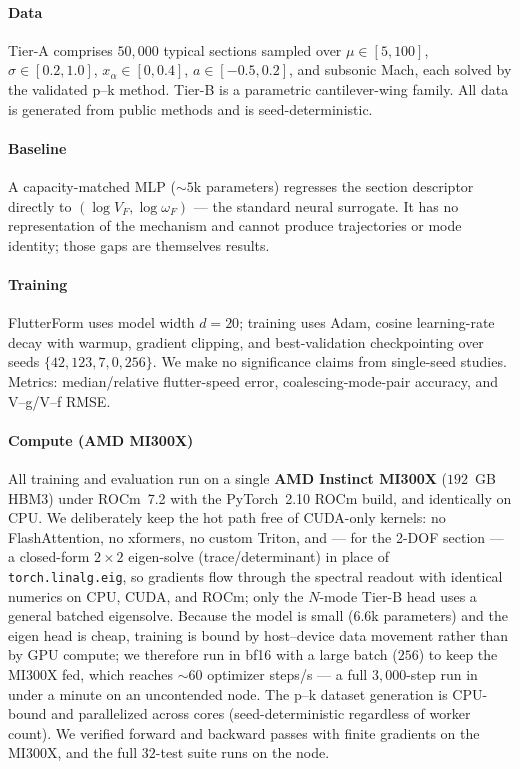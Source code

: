 \documentclass{article}
\begin{document}
\paragraph{Data} Tier-A comprises $50{,}000$ typical sections sampled over
$\mu\!\in\![5,100]$, $\sigma\!\in\![0.2,1.0]$, $x_\alpha\!\in\![0,0.4]$,
$a\!\in\![-0.5,0.2]$, and subsonic Mach, each solved by the validated p--k method.
Tier-B is a parametric cantilever-wing family. All data is generated from public
methods and is seed-deterministic.

\paragraph{Baseline} A capacity-matched MLP ($\sim\!5$k parameters) regresses the
section descriptor directly to $(\log V_F,\log\omega_F)$ --- the standard neural
surrogate. It has no representation of the mechanism and cannot produce
trajectories or mode identity; those gaps are themselves results.

\paragraph{Training} FlutterForm uses model width $d\!=\!20$; training uses Adam,
cosine learning-rate decay with warmup, gradient clipping, and best-validation
checkpointing over seeds $\{42,123,7,0,256\}$. We make no significance claims from
single-seed studies. Metrics: median/relative flutter-speed error,
coalescing-mode-pair accuracy, and V--g/V--f RMSE.

\paragraph{Compute (AMD MI300X)} All training and evaluation run on a single
\textbf{AMD Instinct MI300X} ($192$~GB HBM3) under ROCm~7.2 with the PyTorch~2.10
ROCm build, and identically on CPU. We deliberately keep the hot path free of
CUDA-only kernels: no FlashAttention, no xformers, no custom Triton, and --- for
the 2-DOF section --- a closed-form $2\times2$ eigen-solve (trace/determinant) in
place of \texttt{torch.linalg.eig}, so gradients flow through the spectral readout
with identical numerics on CPU, CUDA, and ROCm; only the $N$-mode Tier-B head uses
a general batched eigensolve. Because the model is small ($6.6$k parameters) and
the eigen head is cheap, training is bound by host--device data movement rather
than by GPU compute; we therefore run in bf16 with a large batch ($256$) to keep
the MI300X fed, which reaches $\sim\!60$ optimizer steps/s --- a full $3{,}000$-step
run in under a minute on an uncontended node. The p--k dataset generation is
CPU-bound and parallelized across cores (seed-deterministic regardless of worker
count). We verified forward and backward passes with finite gradients on the
MI300X, and the full $32$-test suite runs on the node.
\end{document}
